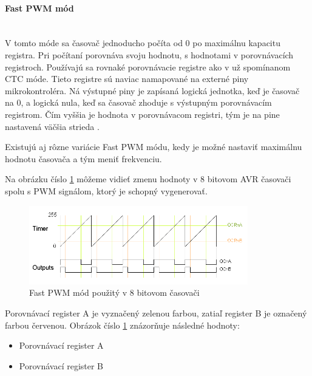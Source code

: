 \paragraph{Fast PWM mód} \mbox{}\\
V tomto móde sa časovač jednoducho počíta od 0 po maximálnu kapacitu registra. Pri počítaní porovnáva svoju hodnotu, s hodnotami v porovnávacích registroch.
Používajú sa rovnaké porovnávacie registre ako v už spomínanom CTC móde. Tieto registre sú naviac namapované na externé piny mikrokontroléra.
Ná výstupné piny je zapísaná logická jednotka, keď je časovač na 0, a logická nula, keď sa časovač zhoduje s výstupným porovnávacím registrom. Čím vyššia je hodnota
v porovnávacom registri, tým je na pine nastavená väčšia strieda \cite{shirriffSecretsArduinoPWM}. \par
Existujú aj rôzne variácie Fast PWM módu, kedy je možné nastaviť maximálnu hodnotu časovača a tým meniť frekvenciu. \par
Na obrázku číslo \ref{figure:fast-pwm-mode} môžeme vidieť zmenu hodnoty v 8 bitovom AVR časovači spolu s PWM signálom, ktorý je schopný vygenerovať.
\begin{figure}[!h]
    \centering
    \includegraphics[width=0.85\textwidth]{img/fast-pwm-graph.png}
    \caption{Fast PWM mód použitý v 8 bitovom časovači}
    \label{figure:fast-pwm-mode}
\end{figure}

Porovnávací register A je vyznačený zelenou farbou, zatiaľ register B je označený farbou červenou. Obrázok číslo \ref{figure:fast-pwm-mode} znázorňuje následné hodnoty:
\begin{itemize}
    \item Porovnávací register A
    \item Porovnávací register B
\end{itemize}

